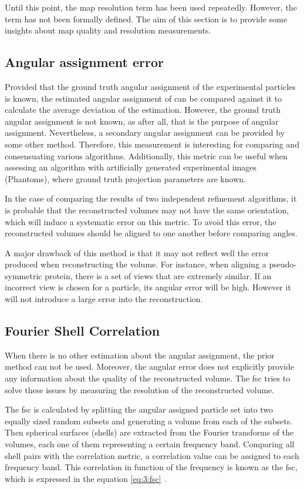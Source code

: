 \documentclass[../main.tex]{subfiles}
\begin{document}
Until this point, the map resolution term has been used repeatedly. However, the term has not been formally defined. The aim of this section is to provide some insights about map quality and resolution measurements.

\subsection{Angular assignment error}
Provided that the ground truth angular assignment of the experimental particles is known, the estimated angular assignment of can be compared against it to calculate the average deviation of the estimation. However, the ground truth angular assignment is not known, as after all, that is the purpose of angular assignment. Nevertheless, a secondary angular assignment can be provided by some other method. Therefore, this measurement is interesting for comparing and consensuating various algorithms. Additionally, this metric can be useful when assessing an algorithm with artificially generated experimental images (Phantoms), where ground truth projection parameters are known.

In the case of comparing the results of two independent refinement algorithms, it is probable that the reconstructed volumes may not have the same orientation, which will induce a systematic error on this metric. To avoid this error, the reconstructed volumes should be aligned to one another before comparing angles.

A major drawback of this method is that it may not reflect well the error produced when reconstructing the volume. For instance, when aligning a pseudo-symmetric protein, there is a set of views that are extremely similar. If an incorrect view is chosen for a particle, its angular error will be high. However it will not introduce a large error into the reconstruction.

\subsection{Fourier Shell Correlation}
When there is no other estimation about the angular assignment, the prior method can not be used. Moreover, the angular error does not explicitly provide any information about the quality of the reconstructed volume. The \gls{fsc} tries to solve these issues by measuring the resolution of the reconstructed volume\cite{sorzano2017a}.

The \gls{fsc} is calculated by splitting the angular assigned particle set into two equally sized random subsets and generating a volume from each of the subsets. Then spherical surfaces (shells) are extracted from the Fourier transforms of the volumes, each one of them representing a certain frequency band. Comparing all shell pairs with the correlation metric, a correlation value can be assigned to each frequency band. This correlation in function of the frequency is known as the \gls{fsc}, which is expressed in the equation \eqref{eq:3:fsc} \cite{dubach2020}\cite{sorzano2017a}.
\end{document}
